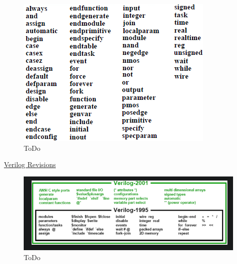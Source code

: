 \documentclass{article}
\begin{document}
	\begin{figure}[H]
		\includegraphics[width=\linewidth]{VerilogPics/figure_10.png}
		\caption{ToDo}
		\label{ToDo}
	\end{figure}

	\underline{Verilog Revisions}
	\begin{figure}[H]
		\includegraphics[width=\linewidth]{VerilogPics/figure_11.png}
		\caption{ToDo}
		\label{ToDo}
	\end{figure}
\end{document}
